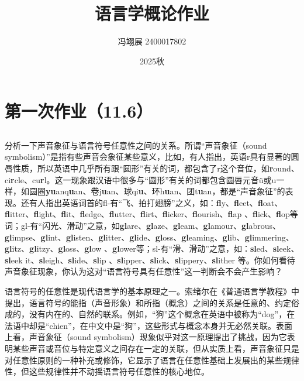 \documentclass[10pt]{ctexart}
\title{\textbf{语言学概论作业}}
\author{冯翊展 2400017802}
\date{2025秋}
\begin{document}
\hypersetup{bookmarksnumbered=true,}

\maketitle

\begin{Large}
\tableofcontents
\end{Large}%
\pagebreak

\section{第一次作业（11.6）}
\subsection{}
{\heiti
分析一下声音象征与语言符号任意性之间的关系。所谓``声音象征（sound symbolism）''是指有些声音会象征某些意义，比如，有人指出，英语r具有显著的圆唇性质，所以英语中几乎所有跟``圆形''有关的词，都包含了r这个音位，如\textbf{r}ound、ci\textbf{r}cle、cu\textbf{r}l。这一现象跟汉语中很多与``圆形''有关的词都包含圆唇元音ü或u一样，如圆圈\textbf{yu}anq\textbf{u}an、卷j\textbf{u}an、球qi\textbf{u}、环h\textbf{u}an、团t\textbf{u}an，都是``声音象征''的表现。还有人指出英语词首的fl-有``飞、拍打翅膀''之义，如：\textbf{fl}y、\textbf{fl}eet、\textbf{fl}oat、\textbf{fl}itter、\textbf{fl}ight、\textbf{fl}it、\textbf{fl}edge、\textbf{fl}utter、\textbf{fl}irt、\textbf{fl}icker、\textbf{fl}ourish、\textbf{fl}ap 、\textbf{fl}ick、\textbf{fl}op等词；gl-有``闪光、滑动''之意，如\textbf{gl}are、\textbf{gl}aze、\textbf{gl}eam、\textbf{gl}amour、\textbf{gl}abrous、\textbf{gl}impse、\textbf{gl}int、\textbf{gl}isten、\textbf{gl}itter、\textbf{gl}ide、\textbf{gl}oss、\textbf{gl}eaming、\textbf{gl}ib、\textbf{gl}immering、\textbf{gl}itz、\textbf{gl}itzy、\textbf{gl}oss、\textbf{gl}ow 、\textbf{gl}ower等；sl-有``滑、滑动''之意，如：\textbf{sl}ed、\textbf{sl}eek、\textbf{sl}eek it、\textbf{sl}eigh、\textbf{sl}ide、\textbf{sl}ip 、\textbf{sl}ipper、\textbf{sl}ick、\textbf{sl}ippery、\textbf{sl}ither 等。你如何看待声音象征现象，你认为这对``语言符号具有任意性''这一判断会不会产生影响？
}

\vspace{0.5cm}

语言符号的任意性是现代语言学的基本原理之一。索绪尔在《普通语言学教程》中提出，语言符号的能指（声音形象）和所指（概念）之间的关系是任意的、约定俗成的，没有内在的、自然的联系。例如，``狗''这个概念在英语中被称为``dog''，在法语中却是``chien''，在中文中是``狗''，这些形式与概念本身并无必然关联。表面上看，声音象征（sound symbolism）现象似乎对这一原理提出了挑战，因为它表明某些声音或音位与特定意义之间存在一定的关联，但从实质上看，声音象征只是对任意性原则的一种补充或修饰，它显示了语言在任意性基础上发展出的某些规律性，但这些规律性并不动摇语言符号任意性的核心地位。
\end{document}
